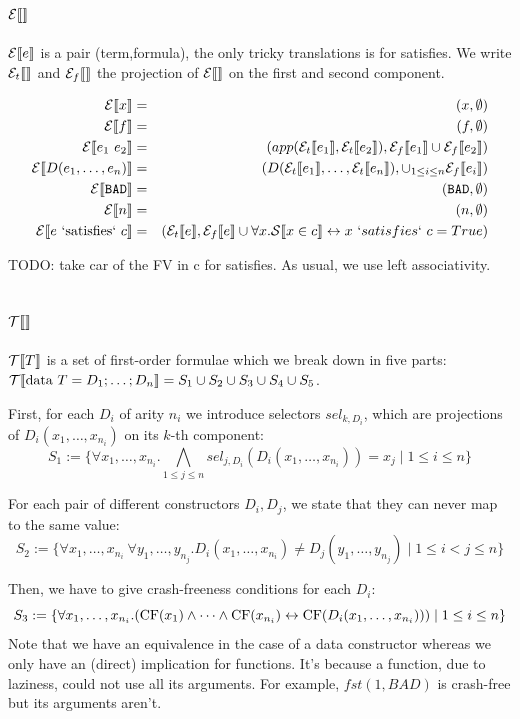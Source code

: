 \documentclass{article}
\begin{document}
\subsection{$\mathcal{E} \llbracket  \rrbracket$}
$\mathcal{E} \llbracket e \rrbracket$ is a pair (term,formula), the only tricky translations is
for satisfies.  We write $\mathcal{E}_t \llbracket  \rrbracket$ and $\mathcal{E}_{f} \llbracket  \rrbracket$ the projection
of $\mathcal{E} \llbracket  \rrbracket$ on the first and second component.

\begin{eqnarray}
\mathcal{E} \llbracket x \rrbracket &=& (x,\emptyset)\\
\mathcal{E} \llbracket f \rrbracket &=& (f,\emptyset)\\
\mathcal{E} \llbracket e_1~e_2 \rrbracket &=& (app(\mathcal{E}_t \llbracket e_1 \rrbracket,\mathcal{E}_t \llbracket e_2 \rrbracket),\mathcal{E}_{f} \llbracket e_1 \rrbracket \cup \mathcal{E}_{f} \llbracket e_2 \rrbracket)\\
\mathcal{E} \llbracket D(e_1,\dots,e_n) \rrbracket &=& (D(\mathcal{E}_t \llbracket e_1 \rrbracket,\dots,\mathcal{E}_t \llbracket e_n \rrbracket),\cup_{1 \leq i \leq n} \mathcal{E}_{f} \llbracket e_i \rrbracket)\\
\mathcal{E} \llbracket \texttt{BAD} \rrbracket &=& (\texttt{BAD},\emptyset)\\
\mathcal{E} \llbracket n \rrbracket &=& (n,\emptyset)\\
\mathcal{E} \llbracket e \mbox{ `satisfies` } c \rrbracket &=& (\mathcal{E}_t \llbracket e \rrbracket,\mathcal{E}_{f} \llbracket e \rrbracket \cup \forall x. \mathcal{S} \llbracket x \in c \rrbracket \leftrightarrow x~`satisfies`~c = True)\\
\end{eqnarray}

TODO: take car of the FV in c for satisfies.
As usual, we use left associativity.

\subsection{$\mathcal{T} \llbracket  \rrbracket$}
$\mathcal{T} \llbracket T \rrbracket$ is a set of first-order formulae which we break down in five parts:
$\mathcal{T} \llbracket \mbox{data } T = D_1 ; \dots ; D_n \rrbracket = S_1 \cup S_2 \cup S_3 \cup S_4 \cup S_5$.

First, for each $D_i$ of arity $n_i$ we introduce selectors $sel_{k,D_i}$, which are projections of $D_i(x_1,\dots,x_n_i)$ on its $k$-th component:
$$S_1 := \{ \forall x_1,\dots,x_{n_i} . \bigwedge_{1 \leq j \leq n} sel_{j,D_i}(D_i(x_1,\dots,x_{n_i})) = x_j \mid 1 \leq i \leq n \}$$

For each pair of different constructors $D_i,D_j$, we state that they can never map to the same value: 
$$S_2 := \{ \forall x_1,\dots,x_{n_i}~\forall y_1,\dots,y_{n_j} . D_i(x_1,\dots,x_{n_i}) \neq D_j(y_1,\dots,y_{n_j}) \mid 1 \leq i < j \leq n \}$$

Then, we have to give crash-freeness conditions for each $D_i$:
$$S_3 := \{ \forall x_1,\dots,x_{n_i} . (\mbox{CF}(x_1) \land \dots \land \mbox{CF}(x_{n_i}) \leftrightarrow \mbox{CF}(D_i(x_1,\dots,x_{n_i}))) \mid 1 \leq i \leq n \}$$
Note that we have an equivalence in the case of a data constructor whereas we only have an (direct) implication for functions. It's because a function, due to laziness, could not use all its arguments. For example, $fst (1,BAD)$ is crash-free but its arguments aren't.
\end{document}
